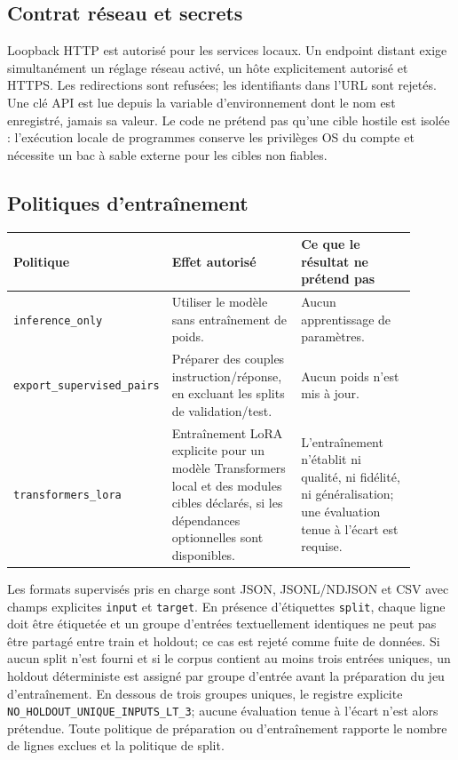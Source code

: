 \documentclass[11pt,a4paper]{article}
\begin{document}
\subsection{Contrat réseau et secrets}
Loopback HTTP est autorisé pour les services locaux. Un endpoint distant exige simultanément un réglage réseau activé, un hôte explicitement autorisé et HTTPS. Les redirections sont refusées; les identifiants dans l'URL sont rejetés. Une clé API est lue depuis la variable d'environnement dont le nom est enregistré, jamais sa valeur. Le code ne prétend pas qu'une cible hostile est isolée : l'exécution locale de programmes conserve les privilèges OS du compte et nécessite un bac à sable externe pour les cibles non fiables.

\subsection{Politiques d'entraînement}
\begin{longtable}{p{0.22\linewidth}p{0.34\linewidth}p{0.34\linewidth}}
\toprule
Politique & Effet autorisé & Ce que le résultat ne prétend pas \\
\midrule
\texttt{inference\_only} & Utiliser le modèle sans entraînement de poids. & Aucun apprentissage de paramètres. \\
\texttt{export\_supervised\_pairs} & Préparer des couples instruction/réponse, en excluant les splits de validation/test. & Aucun poids n'est mis à jour. \\
\texttt{transformers\_lora} & Entraînement LoRA explicite pour un modèle Transformers local et des modules cibles déclarés, si les dépendances optionnelles sont disponibles. & L'entraînement n'établit ni qualité, ni fidélité, ni généralisation; une évaluation tenue à l'écart est requise. \\
\bottomrule
\end{longtable}
Les formats supervisés pris en charge sont JSON, JSONL/NDJSON et CSV avec champs explicites \texttt{input} et \texttt{target}. En présence d'étiquettes \texttt{split}, chaque ligne doit être étiquetée et un groupe d'entrées textuellement identiques ne peut pas être partagé entre train et holdout; ce cas est rejeté comme fuite de données. Si aucun split n'est fourni et si le corpus contient au moins trois entrées uniques, un holdout déterministe est assigné par groupe d'entrée avant la préparation du jeu d'entraînement. En dessous de trois groupes uniques, le registre explicite \texttt{NO\_HOLDOUT\_UNIQUE\_INPUTS\_LT\_3}; aucune évaluation tenue à l'écart n'est alors prétendue. Toute politique de préparation ou d'entraînement rapporte le nombre de lignes exclues et la politique de split.
\end{document}
